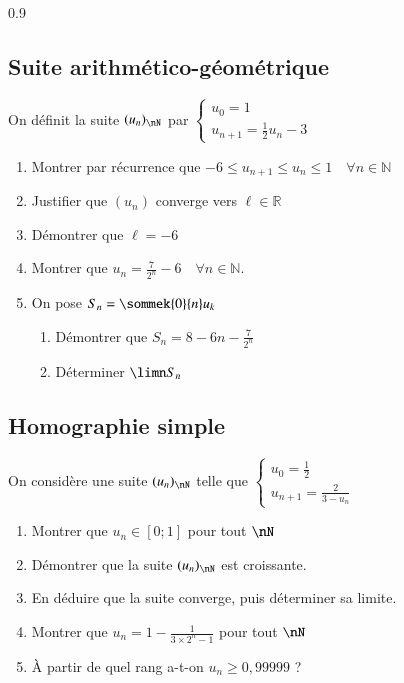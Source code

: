 \documentclass[oneside,12pt]{article}          %
\begin{document}
\begin{spacing}{0.9}
\subsection{Suite arithmético-géométrique}

On définit la suite $(u_n)_{\nN}$ par $\begin{cases}u_0=1\\u_{n+1}=\frac{1}{2}u_n-3\end{cases}$
\begin{enumerate}
    \item Montrer par récurrence que $-6 \leq u_{n+1} \leq u_{n} \leq 1 \quad \forall n \in \mathbb{N}$
    \item Justifier que $(u_n)$ converge vers $\ell \in \mathbb{R}$
    \item Démontrer que $\ell = -6$
    \item Montrer que $u_n = \frac{7}{2^n} - 6 \quad \forall n \in \mathbb{N}$.
    \item On pose $S_n=\sommek{0}{n}u_k $ \begin{enumerate}
    	\item Démontrer que $S_n = 8-6n-\frac{7}{2^n}$
    	\item Déterminer $\limn S_n$
    \end{enumerate}
\end{enumerate}

\end{spacing}


\subsection{Homographie simple}
On considère une suite $(u_n)_{\nN}$ telle que $\begin{cases}u_0=\frac{1}{2}\\u_{n+1}=\frac{2}{3-u_n}\end{cases}$
\begin{enumerate}
    \item Montrer que $u_n\in[0;1]$ pour tout $\nN$
    \item Démontrer que la suite $(u_n)_{\nN}$ est croissante.
    \item En déduire que la suite converge, puis déterminer sa limite.
    \item Montrer que $u_n=1-\frac{1}{3\times2^n-1}$ pour tout $\nN$
    \item À partir de quel rang a-t-on $u_n\geq 0,99999$ ?
\end{enumerate}
\end{document}
